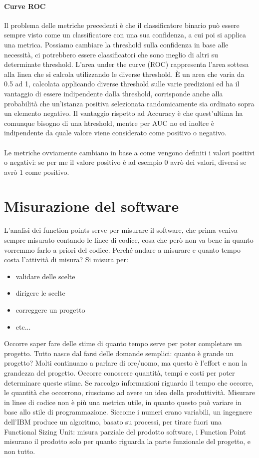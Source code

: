 \documentclass{article}
\begin{document}
\paragraph{Curve ROC}Il problema delle metriche precedenti è che il classificatore binario può essere sempre visto come un classificatore con una sua confidenza, a cui poi si applica una metrica. Possiamo cambiare la threshold sulla confidenza in base alle necessità, ci potrebbero essere classificatori che sono meglio di altri su determinate threshold. L'area under the curve (ROC) rappresenta l'area sottesa alla linea che si calcola utilizzando le diverse threshold. È un area che varia da 0.5 ad 1, calcolata applicando diverse threshold sulle varie predizioni ed ha il vantaggio di essere indipendente dalla threshold, corrisponde anche alla probabilità che un'istanza positiva selezionata randomicamente sia ordinato sopra un elemento negativo. Il vantaggio rispetto ad Accuracy è che quest'ultima ha comunque bisogno di una htreshold, mentre per AUC no ed inoltre è indipendente da quale valore viene considerato come positivo o negativo.\\\\ Le metriche ovviamente cambiano in base a come vengono definiti i valori positivi o negativi: se per me il valore positivo è ad esempio 0 avrò dei valori, diversi se avrò 1 come positivo.



\section{Misurazione del software}
L'analisi dei function points serve per misurare il software, che prima veniva sempre misurato contando le linee di codice, cosa che però non va bene in quanto vorremmo farlo a priori del codice. Perché andare a misurare e quanto tempo costa l'attività di misura? Si misura per:
\begin{itemize}
\item validare delle scelte
\item dirigere le scelte
\item correggere un progetto
\item etc...
\end{itemize}
Occorre saper fare delle stime di quanto tempo serve per poter completare un progetto. Tutto nasce dal farsi delle domande semplici: quanto è grande un progetto? Molti continuano a parlare di ore/uomo, ma questo è l'effort e non la grandezza del progetto. Occorre conoscere quantità, tempi e costi per poter determinare queste stime. Se raccolgo informazioni riguardo il tempo che occorre, le quantità che occorrono, riusciamo ad avere un idea della produttività. Misurare in linee di codice non è più una metrica utile, in quanto questo può variare in base allo stile di programmazione. Siccome i numeri erano variabili, un ingegnere dell'IBM produce un algoritmo, basato su processi, per tirare fuori una Functional Sizing Unit: misura parziale del prodotto software, i Function Point misurano il prodotto solo per quanto riguarda la parte funzionale del progetto, e non tutto.
\end{document}
